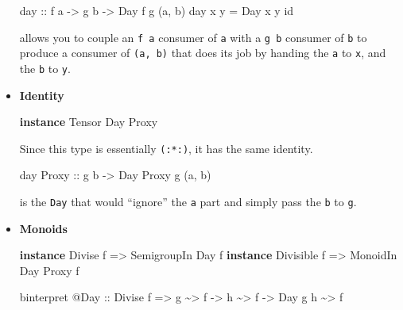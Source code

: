 \documentclass[]{article}
\newenvironment{Shaded}{}{}
\newcommand{\DataTypeTok}[1]{\textcolor[rgb]{0.56,0.13,0.00}{#1}}
\newcommand{\FunctionTok}[1]{\textcolor[rgb]{0.02,0.16,0.49}{#1}}
\newcommand{\KeywordTok}[1]{\textcolor[rgb]{0.00,0.44,0.13}{\textbf{#1}}}
\newcommand{\NormalTok}[1]{#1}
\newcommand{\OperatorTok}[1]{\textcolor[rgb]{0.40,0.40,0.40}{#1}}
\newcommand{\OtherTok}[1]{\textcolor[rgb]{0.00,0.44,0.13}{#1}}
\begin{document}
\begin{itemize}
\begin{Shaded}
\begin{Highlighting}[]
\OtherTok{day ::}\NormalTok{ f a }\OtherTok{{-}>}\NormalTok{ g b }\OtherTok{{-}>} \DataTypeTok{Day}\NormalTok{ f g (a, b)}
\NormalTok{day x y }\OtherTok{=} \DataTypeTok{Day}\NormalTok{ x y }\FunctionTok{id}
\end{Highlighting}
\end{Shaded}

  allows you to couple an \texttt{f\ a} consumer of \texttt{a} with a
  \texttt{g\ b} consumer of \texttt{b} to produce a consumer of \texttt{(a,\ b)}
  that does its job by handing the \texttt{a} to \texttt{x}, and the \texttt{b}
  to \texttt{y}.
\item
  \textbf{Identity}

\begin{Shaded}
\begin{Highlighting}[]
\KeywordTok{instance} \DataTypeTok{Tensor} \DataTypeTok{Day} \DataTypeTok{Proxy}
\end{Highlighting}
\end{Shaded}

  Since this type is essentially \texttt{(:*:)}, it has the same identity.

\begin{Shaded}
\begin{Highlighting}[]
\NormalTok{day }\DataTypeTok{Proxy}\OtherTok{ ::}\NormalTok{ g b }\OtherTok{{-}>} \DataTypeTok{Day} \DataTypeTok{Proxy}\NormalTok{ g (a, b)}
\end{Highlighting}
\end{Shaded}

  is the \texttt{Day} that would ``ignore'' the \texttt{a} part and simply pass
  the \texttt{b} to \texttt{g}.
\item
  \textbf{Monoids}

\begin{Shaded}
\begin{Highlighting}[]
\KeywordTok{instance} \DataTypeTok{Divise}\NormalTok{    f }\OtherTok{=>} \DataTypeTok{SemigroupIn} \DataTypeTok{Day}\NormalTok{ f}
\KeywordTok{instance} \DataTypeTok{Divisible}\NormalTok{ f }\OtherTok{=>} \DataTypeTok{MonoidIn}    \DataTypeTok{Day} \DataTypeTok{Proxy}\NormalTok{ f}

\NormalTok{binterpret }\OperatorTok{@}\DataTypeTok{Day}
\OtherTok{    ::} \DataTypeTok{Divise}\NormalTok{ f}
    \OtherTok{=>}\NormalTok{ g }\OperatorTok{\textasciitilde{}>}\NormalTok{ f}
    \OtherTok{{-}>}\NormalTok{ h }\OperatorTok{\textasciitilde{}>}\NormalTok{ f}
    \OtherTok{{-}>} \DataTypeTok{Day}\NormalTok{ g h }\OperatorTok{\textasciitilde{}>}\NormalTok{ f}


\end{Highlighting}
\end{Shaded}
\end{itemize}
\end{document}
